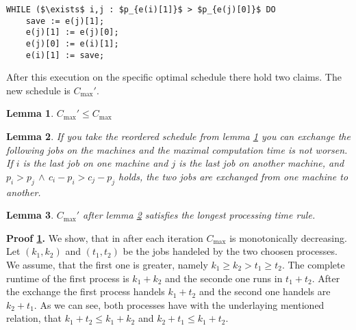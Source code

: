 \documentclass[11pt,a4paper,ngerman]{article}
\newtheorem{lemma}{\bfseries Lemma}
\begin{document}
\begin{description}
        \begin{lstlisting}
WHILE ($\exists$ i,j : $p_{e(i)[1]}$ > $p_{e(j)[0]}$ DO
    save := e(j)[1];
    e(j)[1] := e(j)[0];
    e(j)[0] := e(i)[1];
    e(i)[1] := save;
        \end{lstlisting} 
\pagebreak
        After this execution on the specific optimal schedule there hold two claims. The
        new schedule is $C_{\max}'$.
        \begin{lemma} \label{apx:ueb3:cmax}
            {\itshape
            $C_{\max}' \leq C_{\max}$
            }
        \end{lemma}
        \begin{lemma} \label{apx:ueb3:lastreordering}
            {\itshape
                If you take the reordered schedule from lemma \ref{apx:ueb3:cmax}
                you can exchange the following jobs on the machines and
                the maximal computation time is not worsen.\\
                If $i$ is the last job on one machine and $j$ is the last
                job on another machine, and $p_i>p_j \, \land \, c_i-p_i > c_j-p_j$
                holds, the two jobs are exchanged from one machine to
                another.
            }
        \end{lemma}
        \begin{lemma} \label{apx:ueb3:latest}
            {\itshape
            $C_{\max}'$ after lemma \ref{apx:ueb3:lastreordering} 
            satisfies the longest processing time rule.
            }
        \end{lemma}
        \begin{description}
            \item{\bfseries\rmfamily Proof \ref{apx:ueb3:cmax}. }
                We show, that in after each iteration $C_{\max}$ is
                monotonically decreasing. Let $(k_1,k_2)$ and $(t_1,t_2)$ be the
                jobs handeled by the two choosen processes. We assume, that the first
                one is greater, namely $k_1 \geq k_2 > t_1 \geq t_2$.
                The complete runtime of the first process is $k_1 + k_2$ and the seconde
                one runs in $t_1 + t_2$.
                After the exchange the first process handels $k_1+t_2$ and the second
                one handels are $k_2+t_1$. As we can see, both processes have with the
                underlaying mentioned relation, that $k_1+t_2 \leq k_1 + k_2$ and 
                $k_2+t_1 \leq k_1+t_2$.\\


\end{description}
\end{description}
\end{document}
